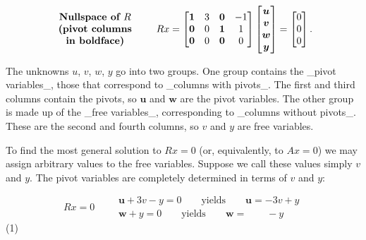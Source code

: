\[\begin{array}{c}\mbox{\bf Nullspace of $R$}\\ \mbox{\bf(pivot columns}\\ \mbox{\bf in boldface)}\end{array}\qquad Rx=\begin{bmatrix}\mathbf{1}&3& \mathbf{0}&-1\\ \mathbf{0}&0&\mathbf{1}&1\\ \mathbf{0}&0&\mathbf{0}&0\end{bmatrix}\begin{bmatrix}\boldsymbol{u}\\ \boldsymbol{v}\\ \boldsymbol{w}\\ \boldsymbol{y}\end{bmatrix}=\begin{bmatrix}0\\ 0\\ 0\end{bmatrix}.\]

The unknowns \(u\), \(v\), \(w\), \(y\) go into two groups. One group contains the _pivot variables_, those that correspond to _columns with pivots_. The first and third columns contain the pivots, so \(\boldsymbol{u}\) and \(\boldsymbol{w}\) are the pivot variables. The other group is made up of the _free variables_, corresponding to _columns without pivots_. These are the second and fourth columns, so \(v\) and \(y\) are free variables.

To find the most general solution to \(Rx=0\) (or, equivalently, to \(Ax=0\)) we may assign arbitrary values to the free variables. Suppose we call these values simply \(v\) and \(y\). The pivot variables are completely determined in terms of \(v\) and \(y\):

\[Rx=0\qquad\begin{array}{c}\boldsymbol{u}+3v-y=0\qquad\mbox{yields}\qquad \boldsymbol{u}=-3v+y\\ \boldsymbol{w}+y=0\qquad\mbox{yields}\qquad\boldsymbol{w}=\qquad-y\end{array}\] (1) 